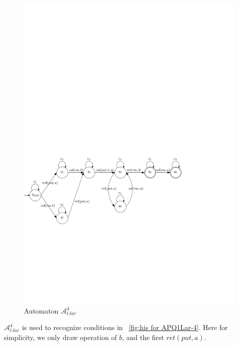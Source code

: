 \begin{figure}[htbp]
  \centering
  \includegraphics[width=0.9 \textwidth]{figures/PIC_AUTO_PQ1Lar-rprp.pdf}
  \caption{Automaton $\mathcal{A}_{\textit{l-lar}}^4$}
  \label{fig:automata APQ1Lar-4}
\end{figure}


$\mathcal{A}_{\textit{l-lar}}^4$ is used to recognize conditions in \figurename~\ref{fig:his for APQ1Lar-4}. Here for simplicity, we only draw operation of $b$, and the first $\textit{ret}(\textit{put},a)$.


